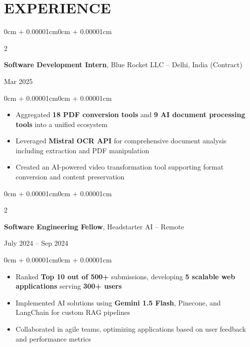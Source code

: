 \documentclass[10pt, letterpaper]{article}
\newenvironment{highlights}{
    \begin{itemize}[
        topsep=0.04cm,
        parsep=0.04cm,
        partopsep=0pt,
        itemsep=0.01cm,
        leftmargin=0.2cm + 9pt
    ]
}{
    \end{itemize}
}
\newenvironment{onecolentry}{
    \begin{adjustwidth}{0cm + 0.00001cm}{0cm + 0.00001cm}
}{
    \end{adjustwidth}
}
\newenvironment{twocolentry}[2][]{
    \onecolentry
    \def\secondColumn{#2}
    \setcolumnwidth{\fill, 4.2cm}
    \begin{paracol}{2}
}{
    \switchcolumn \raggedleft \secondColumn
    \end{paracol}
    \endonecolentry
}
\begin{document}
    \section{EXPERIENCE}
        \begin{twocolentry}{
            Mar 2025
        }
            \textbf{Software Development Intern}, \textcolor{primaryColor}{Blue Rocket LLC} -- Delhi, India (Contract)
        \end{twocolentry}
        \vspace{0.02cm}
        \begin{onecolentry}
            \begin{highlights}
                \item Aggregated \textbf{18 PDF conversion tools} and \textbf{9 AI document processing tools} into a unified ecosystem
                \item Leveraged \textbf{Mistral OCR API} for comprehensive document analysis including extraction and PDF manipulation
                \item Created an AI-powered video transformation tool supporting format conversion and content preservation
            \end{highlights}
        \end{onecolentry}
    
        \vspace{0.08cm}
        \begin{twocolentry}{
            July 2024 – Sep 2024
        }
            \textbf{Software Engineering Fellow}, \textcolor{primaryColor}{Headstarter AI} -- Remote
        \end{twocolentry}
        \vspace{0.02cm}
        \begin{onecolentry}
            \begin{highlights}
                \item Ranked \textbf{Top 10 out of 500+} submissions, developing \textbf{5 scalable web applications} serving \textbf{300+ users}
                \item Implemented AI solutions using \textbf{Gemini 1.5 Flash}, Pinecone, and LangChain for custom RAG pipelines
                \item Collaborated in agile teams, optimizing applications based on user feedback and performance metrics
            \end{highlights}
        \end{onecolentry}
\end{document}
